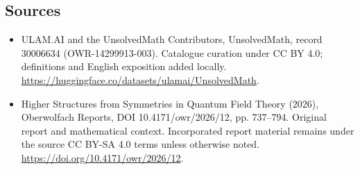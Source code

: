 \documentclass[11pt]{article}
\begin{document}
\subsection{Sources}
\begin{itemize}
\item[\hypertarget{source:30006634:1}{S1}] ULAM.AI and the UnsolvedMath Contributors, UnsolvedMath, record 30006634 (OWR-14299913-003). Catalogue curation under CC BY 4.0; definitions and English exposition added locally.
\url{https://huggingface.co/datasets/ulamai/UnsolvedMath}.
\item[\hypertarget{source:30006634:2}{S2}] Higher Structures from Symmetries in Quantum Field Theory (2026), Oberwolfach Reports, DOI 10.4171/owr/2026/12, pp. 737--794. Original report and mathematical context. Incorporated report material remains under the source CC BY-SA 4.0 terms unless otherwise noted.
\url{https://doi.org/10.4171/owr/2026/12}.
\end{itemize}
\label{end:30006634}
\end{document}
